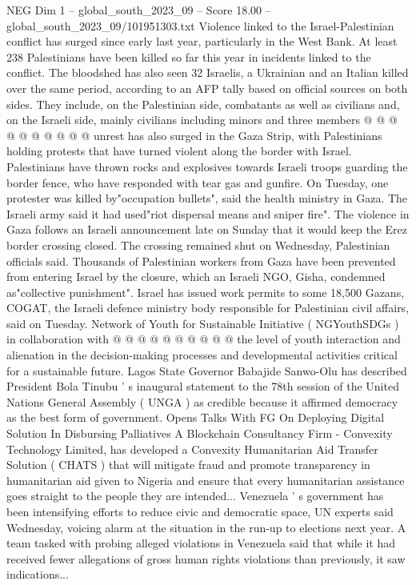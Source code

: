 \begin{textsample}{NEG Dim 1 – global\_south\_2023\_09 – Score 18.00 – global\_south\_2023\_09/101951303.txt}
Violence linked to the Israel-Palestinian conflict has surged since early last year, particularly in the West Bank.
At least 238 Palestinians have been killed so far this year in incidents linked to the conflict.
The bloodshed has also seen 32 Israelis, a Ukrainian and an Italian killed over the same period, according to an AFP tally based on official sources on both sides.
They include, on the Palestinian side, combatants as well as civilians and, on the Israeli side, mainly civilians including minors and three members @ @ @ @ @ @ @ @ @ @ unrest has also surged in the Gaza Strip, with Palestinians holding protests that have turned violent along the border with Israel.
Palestinians have thrown rocks and explosives towards Israeli troops guarding the border fence, who have responded with tear gas and gunfire.
On Tuesday, one protester was killed by"occupation bullets", said the health ministry in Gaza.
The Israeli army said it had used"riot dispersal means and sniper fire".
The violence in Gaza follows an Israeli announcement late on Sunday that it would keep the Erez border crossing closed.
The crossing remained shut on Wednesday, Palestinian officials said.
Thousands of Palestinian workers from Gaza have been prevented from entering Israel by the closure, which an Israeli NGO, Gisha, condemned as"collective punishment".
Israel has issued work permits to some 18,500 Gazans, COGAT, the Israeli defence ministry body responsible for Palestinian civil affairs, said on Tuesday.
Network of Youth for Sustainable Initiative ( NGYouthSDGs ) in collaboration with @ @ @ @ @ @ @ @ @ @ the level of youth interaction and alienation in the decision-making processes and developmental activities critical for a sustainable future.
Lagos State Governor Babajide Sanwo-Olu has described President Bola Tinubu ' s inaugural statement to the 78th session of the United Nations General Assembly ( UNGA ) as credible because it affirmed democracy as the best form of government.
Opens Talks With FG On Deploying Digital Solution In Disbursing Palliatives A Blockchain Consultancy Firm - Convexity Technology Limited, has developed a Convexity Humanitarian Aid Transfer Solution ( CHATS ) that will mitigate fraud and promote transparency in humanitarian aid given to Nigeria and ensure that every humanitarian assistance goes straight to the people they are intended...
Venezuela ' s government has been intensifying efforts to reduce civic and democratic space, UN experts said Wednesday, voicing alarm at the situation in the run-up to elections next year.
A team tasked with probing alleged violations in Venezuela said that while it had received fewer allegations of gross human rights violations than previously, it saw indications...

\end{textsample}
